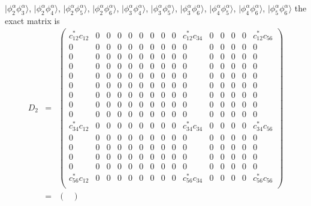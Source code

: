 \documentclass[aip,graphicx]{revtex4-1}
\begin{document}
\begin{itemize}
         $|\phi^\alpha_2\phi^\alpha_3\rangle$,
         $|\phi^\alpha_2\phi^\alpha_4\rangle$,
         $|\phi^\alpha_2\phi^\alpha_5\rangle$,
         $|\phi^\alpha_2\phi^\alpha_6\rangle$,
         $|\phi^\alpha_3\phi^\alpha_4\rangle$,
         $|\phi^\alpha_3\phi^\alpha_5\rangle$,
         $|\phi^\alpha_3\phi^\alpha_6\rangle$,
         $|\phi^\alpha_4\phi^\alpha_5\rangle$,
         $|\phi^\alpha_4\phi^\alpha_6\rangle$,
         $|\phi^\alpha_5\phi^\alpha_6\rangle$
         the exact matrix is
         \begin{eqnarray}
         D_2 &=&
         \begin{pmatrix}
         c_{12}^*c_{12} & 0 & 0 & 0 & 0 & 0 & 0 & 0 & 0 & c_{12}^*c_{34} & 0 & 0 & 0 & 0 & c_{12}^*c_{56} \\
         0 & 0 & 0 & 0 & 0 & 0 & 0 & 0 & 0 & 0 & 0 & 0 & 0 & 0 & 0 \\
         0 & 0 & 0 & 0 & 0 & 0 & 0 & 0 & 0 & 0 & 0 & 0 & 0 & 0 & 0 \\
         0 & 0 & 0 & 0 & 0 & 0 & 0 & 0 & 0 & 0 & 0 & 0 & 0 & 0 & 0 \\
         0 & 0 & 0 & 0 & 0 & 0 & 0 & 0 & 0 & 0 & 0 & 0 & 0 & 0 & 0 \\
         0 & 0 & 0 & 0 & 0 & 0 & 0 & 0 & 0 & 0 & 0 & 0 & 0 & 0 & 0 \\
         0 & 0 & 0 & 0 & 0 & 0 & 0 & 0 & 0 & 0 & 0 & 0 & 0 & 0 & 0 \\
         0 & 0 & 0 & 0 & 0 & 0 & 0 & 0 & 0 & 0 & 0 & 0 & 0 & 0 & 0 \\
         0 & 0 & 0 & 0 & 0 & 0 & 0 & 0 & 0 & 0 & 0 & 0 & 0 & 0 & 0 \\
         c_{34}^*c_{12} & 0 & 0 & 0 & 0 & 0 & 0 & 0 & 0 & c_{34}^*c_{34} & 0 & 0 & 0 & 0 & c_{34}^*c_{56} \\
         0 & 0 & 0 & 0 & 0 & 0 & 0 & 0 & 0 & 0 & 0 & 0 & 0 & 0 & 0 \\
         0 & 0 & 0 & 0 & 0 & 0 & 0 & 0 & 0 & 0 & 0 & 0 & 0 & 0 & 0 \\
         0 & 0 & 0 & 0 & 0 & 0 & 0 & 0 & 0 & 0 & 0 & 0 & 0 & 0 & 0 \\
         0 & 0 & 0 & 0 & 0 & 0 & 0 & 0 & 0 & 0 & 0 & 0 & 0 & 0 & 0 \\
         c_{56}^*c_{12} & 0 & 0 & 0 & 0 & 0 & 0 & 0 & 0 & c_{56}^*c_{34} & 0 & 0 & 0 & 0 & c_{56}^*c_{56} \\
         \end{pmatrix} \\
         \label{Eq:D2aa6-wfn}
         &=&
         \begin{pmatrix}

\end{pmatrix}
\end{eqnarray}
\end{itemize}
\end{document}
